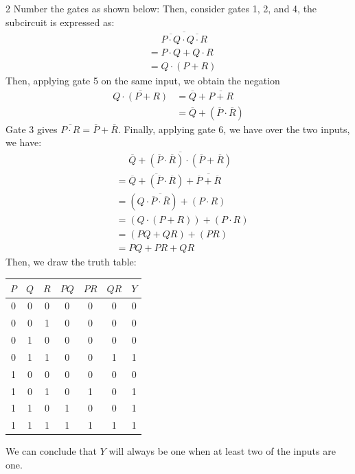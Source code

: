 \begin{multicols}{2}
Number the gates as shown below:
Then, consider gates 1, 2, and 4, the subcircuit is expressed as:
\begin{align*}
    &\phantom{=}\overline{\overline{P\cdot Q}\cdot\overline{Q\cdot R}}\\
    &=P\cdot Q + Q\cdot R\\
    &=Q\cdot(P+R)
\end{align*}
Then, applying gate 5 on the same input, we obtain the negation 
\begin{align*}
    \overline{Q\cdot(P+R)} &= \overline{Q}+\overline{P+R} \\
    &= \overline{Q}+(\overline{P}\cdot\overline{R})
\end{align*}
Gate 3 gives $\overline{P\cdot R}=\overline{P}+\overline{R}$.
Finally, applying gate 6, we have over the two inputs, we have:
\begin{align*}
    &\phantom{=}\overline{\overline{Q}+(\overline{P}\cdot\overline{R}) \cdot (\overline{P}+\overline{R})}\\
    &=\overline{\overline{Q}+(\overline{P}\cdot\overline{R})} + \overline{\overline{P}+\overline{R}}\\
    &=(Q\cdot\overline{\overline{P}\cdot\overline{R}}) + (P\cdot R)\\
    &=(Q\cdot(P+R)) + (P\cdot R)\\
    &=(PQ+QR)+(PR)\\
    &=PQ+PR+QR
\end{align*}
Then, we draw the truth table:
\begin{center}
    \begin{tabular}{ccc|ccc|c}
        $P$ & $Q$ & $R$ & $PQ$ & $PR$ & $QR$ & $Y$ \\ \hline
        0 & 0 & 0 & 0 & 0 & 0 & 0 \\
        0 & 0 & 1 & 0 & 0 & 0 & 0 \\
        0 & 1 & 0 & 0 & 0 & 0 & 0 \\
        0 & 1 & 1 & 0 & 0 & 1 & 1 \\
        1 & 0 & 0 & 0 & 0 & 0 & 0 \\
        1 & 0 & 1 & 0 & 1 & 0 & 1 \\
        1 & 1 & 0 & 1 & 0 & 0 & 1 \\
        1 & 1 & 1 & 1 & 1 & 1 & 1 
    \end{tabular}
\end{center}
We can conclude that $Y$ will always be one when at least two of the inputs are one.


\end{multicols}
